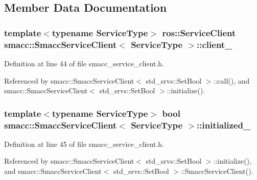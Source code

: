 \subsection{Member Data Documentation}
\subsubsection[{\texorpdfstring{client\+\_\+}{client_}}]{\setlength{\rightskip}{0pt plus 5cm}template$<$typename Service\+Type$>$ ros\+::\+Service\+Client {\bf smacc\+::\+Smacc\+Service\+Client}$<$ Service\+Type $>$\+::client\+\_\+\hspace{0.3cm}{\ttfamily [protected]}}\hypertarget{classsmacc_1_1SmaccServiceClient_a6eed795ca67ec50096a9e5695d4281c6}{}\label{classsmacc_1_1SmaccServiceClient_a6eed795ca67ec50096a9e5695d4281c6}


Definition at line 44 of file smacc\+\_\+service\+\_\+client.\+h.



Referenced by smacc\+::\+Smacc\+Service\+Client$<$ std\+\_\+srvs\+::\+Set\+Bool $>$\+::call(), and smacc\+::\+Smacc\+Service\+Client$<$ std\+\_\+srvs\+::\+Set\+Bool $>$\+::initialize().

\subsubsection[{\texorpdfstring{initialized\+\_\+}{initialized_}}]{\setlength{\rightskip}{0pt plus 5cm}template$<$typename Service\+Type$>$ {\bf bool} {\bf smacc\+::\+Smacc\+Service\+Client}$<$ Service\+Type $>$\+::initialized\+\_\+\hspace{0.3cm}{\ttfamily [protected]}}\hypertarget{classsmacc_1_1SmaccServiceClient_a251b147a783f05d13edb272b85f64982}{}\label{classsmacc_1_1SmaccServiceClient_a251b147a783f05d13edb272b85f64982}


Definition at line 45 of file smacc\+\_\+service\+\_\+client.\+h.



Referenced by smacc\+::\+Smacc\+Service\+Client$<$ std\+\_\+srvs\+::\+Set\+Bool $>$\+::initialize(), and smacc\+::\+Smacc\+Service\+Client$<$ std\+\_\+srvs\+::\+Set\+Bool $>$\+::\+Smacc\+Service\+Client().

